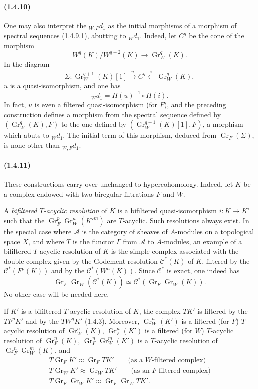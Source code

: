 \documentclass[10pt]{article}
\newcommand{\Gr}{\operatorname{Gr}}
\newcommand{\calA}{\mathcal A}
\begin{document}
\paragraph{(1.4.10)} One may also interpret the ${}_{W,F}d_1$ as the initial morphisms of a morphism of spectral sequences (1.4.9.1), abutting to ${}_Wd_1$. Indeed, let $C^q$ be the cone of the morphism
\[
W^q(K)/W^{q+2}(K)\longrightarrow\Gr_W^q(K).
\]
In the diagram
\[
\Sigma:\Gr_W^{q+1}(K)[1]\xrightarrow{u} C^q\xleftarrow{i}\Gr_W^q(K),
\]
$u$ is a quasi-isomorphism, and one has
\[
{}_Wd_1=H(u)^{-1}\circ H(i).
\]
In fact, $u$ is even a filtered quasi-isomorphism (for $F$), and the preceding construction defines a morphism from the spectral sequence defined by $(\Gr_W^q(K),F)$ to the one defined by $(\Gr_W^{q+1}(K)[1],F)$, a morphism which abuts to ${}_Wd_1$. The initial term of this morphism, deduced from $\Gr_F(\Sigma)$, is none other than ${}_{W,F}d_1$.

\paragraph{(1.4.11)} These constructions carry over unchanged to hypercohomology. Indeed, let $K$ be a complex endowed with two biregular filtrations $F$ and $W$.

A \emph{bifiltered $T$-acyclic resolution} of $K$ is a bifiltered quasi-isomorphism $i:K\to K'$ such that the $\Gr_F^p\Gr_W^n(K'^m)$ are $T$-acyclic. Such resolutions always exist. In the special case where $\calA$ is the category of sheaves of $A$-modules on a topological space $X$, and where $T$ is the functor $\Gamma$ from $\calA$ to $A$-modules, an example of a bifiltered $T$-acyclic resolution of $K$ is the simple complex associated with the double complex given by the Godement resolution $\mathcal C^*(K)$ of $K$, filtered by the $\mathcal C^*(F^p(K))$ and by the $\mathcal C^*(W^n(K))$. Since $\mathcal C^*$ is exact, one indeed has
\[
\Gr_F\Gr_W(\mathcal C^*(K))\simeq \mathcal C^*(\Gr_F\Gr_W(K)).
\]
No other case will be needed here.

If $K'$ is a bifiltered $T$-acyclic resolution of $K$, the complex $TK'$ is filtered by the $TF^pK'$ and by the $TW^qK'$ (1.4.3). Moreover, $\Gr_W^n(K')$ is a filtered (for $F$) $T$-acyclic resolution of $\Gr_W^n(K)$, $\Gr_F^n(K')$ is a filtered (for $W$) $T$-acyclic resolution of $\Gr_F^n(K)$, $\Gr_F^n\Gr_W^m(K')$ is a $T$-acyclic resolution of $\Gr_F^n\Gr_W^m(K)$, and
\[
\begin{gathered}
T\Gr_FK'\approx\Gr_FTK'\qquad\text{(as a $W$-filtered complex)}\\
T\Gr_WK'\approx\Gr_WTK'\qquad\text{(as an $F$-filtered complex)}\\
T\Gr_F\Gr_WK'\approx\Gr_F\Gr_WTK'.
\end{gathered}
\]
\end{document}
